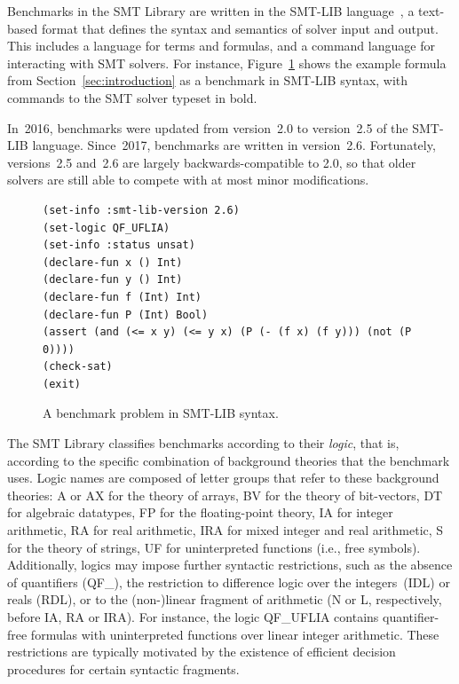 \documentclass[dvipsnames,table,twoside,11pt]{article}
\begin{document}
Benchmarks in the SMT Library are written in the SMT-LIB
language~\cite{BarFT-RR-17}, a text-based format that defines the
syntax and semantics of solver input and output.  This includes a
language for terms and formulas, and a command language for
interacting with SMT solvers.  For instance,
Figure~\ref{fig:smtlib-example} shows the example formula from
Section~\ref{sec:introduction} as a benchmark in SMT-LIB syntax, with
commands to the SMT solver typeset in bold.

In~2016, benchmarks were updated from version~2.0 to version~2.5 of
the SMT-LIB language.  Since~2017, benchmarks are written in
version~2.6.  Fortunately, versions~2.5 and~2.6 are largely
backwards-compatible to 2.0, so that older solvers are still able to
compete with at most minor modifications.

\begin{figure}
\begin{lstlisting}
(set-info :smt-lib-version 2.6)
(set-logic QF_UFLIA)
(set-info :status unsat)
(declare-fun x () Int)
(declare-fun y () Int)
(declare-fun f (Int) Int)
(declare-fun P (Int) Bool)
(assert (and (<= x y) (<= y x) (P (- (f x) (f y))) (not (P 0))))
(check-sat)
(exit)
\end{lstlisting}
\caption{A benchmark problem in SMT-LIB syntax.}
\label{fig:smtlib-example}
\end{figure}

The SMT Library classifies benchmarks according to their \emph{logic},
that is, according to the specific combination of background theories
that the benchmark uses.  Logic names are composed of letter groups
that refer to these background theories: {A} or {AX} for the theory of
arrays, {BV} for the theory of bit-vectors, {DT} for algebraic
datatypes, {FP} for the floating-point theory, {IA} for integer
arithmetic, {RA} for real arithmetic, {IRA} for mixed integer and real
arithmetic, {S} for the theory of strings, {UF} for uninterpreted
functions (i.e., free symbols).  Additionally, logics may impose
further syntactic restrictions, such as the absence of quantifiers
({QF\_}), the restriction to difference logic over the
integers~({IDL}) or reals ({RDL}), or to the (non-)linear fragment of
arithmetic ({N} or {L}, respectively, before {IA}, {RA} or {IRA}).
For instance, the logic QF\_UFLIA contains quantifier-free formulas
with uninterpreted functions over linear integer arithmetic.  These
restrictions are typically motivated by the existence of efficient
decision procedures for certain syntactic fragments.
\end{document}
